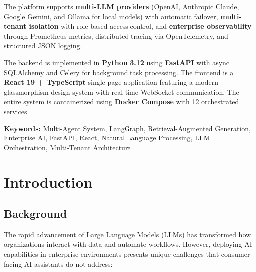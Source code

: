 \documentclass[12pt, a4paper]{report}
\begin{document}
The platform supports \textbf{multi-LLM providers} (OpenAI, Anthropic Claude, Google Gemini, and Ollama for local models) with automatic failover, \textbf{multi-tenant isolation} with role-based access control, and \textbf{enterprise observability} through Prometheus metrics, distributed tracing via OpenTelemetry, and structured JSON logging.

The backend is implemented in \textbf{Python 3.12} using \textbf{FastAPI} with async SQLAlchemy and Celery for background task processing. The frontend is a \textbf{React 19 + TypeScript} single-page application featuring a modern glassmorphism design system with real-time WebSocket communication. The entire system is containerized using \textbf{Docker Compose} with 12 orchestrated services.

\vspace{0.5cm}
\noindent\textbf{Keywords:} Multi-Agent System, LangGraph, Retrieval-Augmented Generation, Enterprise AI, FastAPI, React, Natural Language Processing, LLM Orchestration, Multi-Tenant Architecture

\newpage
\tableofcontents
\newpage
\listoffigures
\newpage
\listoftables

\chapter{Introduction}

\section{Background}

The rapid advancement of Large Language Models (LLMs) has transformed how organizations interact with data and automate workflows. However, deploying AI capabilities in enterprise environments presents unique challenges that consumer-facing AI assistants do not address:
\end{document}
